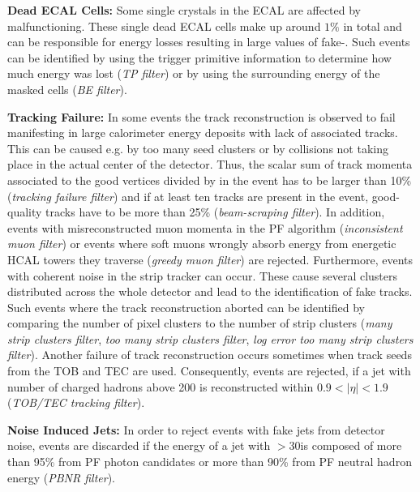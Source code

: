 \begin{description}
 \item{\textbf{Dead ECAL Cells:}} Some single crystals in the ECAL are affected by malfunctioning. These single dead ECAL cells make up around $1\%$ in total and can be responsible for energy losses resulting in large values of fake-\MHT. Such events can be identified by using the trigger primitive information to determine how much energy was lost (\textit{TP filter}) or by using the surrounding energy of the masked cells (\textit{BE filter}).
 \item{\textbf{Tracking Failure:}} In some events the track reconstruction is observed to fail manifesting in large calorimeter energy deposits with lack of associated tracks. This can be caused e.g. by too many seed clusters or by collisions not taking place in the actual center of the detector. Thus, the scalar sum of track momenta associated to the good vertices divided by \HT in the event has to be larger than 10\% (\textit{tracking failure filter}) and if at least ten tracks are present in the event, good-quality tracks have to be more than 25\% (\textit{beam-scraping filter}). In addition, events with misreconstructed muon momenta in the PF algorithm (\textit{inconsistent muon filter}) or events where soft muons wrongly absorb energy from energetic HCAL towers they traverse (\textit{greedy muon filter}) are rejected. Furthermore, events with coherent noise in the strip tracker can occur. These cause several clusters distributed across the whole detector and lead to the identification of fake tracks. Such events where the track reconstruction aborted can be identified by comparing the number of pixel clusters to the number of strip clusters (\textit{many strip clusters filter}, \textit{too many strip clusters filter}, \textit{log error too many strip clusters filter}). Another failure of track reconstruction occurs sometimes when track seeds from the TOB and TEC are used. Consequently, events are rejected, if a jet with number of charged hadrons above 200 is reconstructed within $0.9 < |\eta| < 1.9$ (\textit{TOB/TEC tracking filter}).
 \item{\textbf{Noise Induced Jets:}} In order to reject events with fake jets from detector noise, events are discarded if the energy of a jet with \pt$ > 30$\gev is composed of more than 95\% from PF photon candidates or more than 90\% from PF neutral hadron energy (\textit{PBNR filter}).
\end{description}

